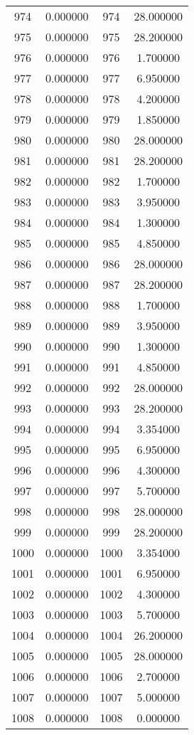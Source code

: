 \documentclass[12pt]{article}
\begin{document}
\begin{longtable}{@{}cccc@{}}
974 & 0.000000 & 974 & 28.000000 \\
975 & 0.000000 & 975 & 28.200000 \\
976 & 0.000000 & 976 & 1.700000 \\
977 & 0.000000 & 977 & 6.950000 \\
978 & 0.000000 & 978 & 4.200000 \\
979 & 0.000000 & 979 & 1.850000 \\
980 & 0.000000 & 980 & 28.000000 \\
981 & 0.000000 & 981 & 28.200000 \\
982 & 0.000000 & 982 & 1.700000 \\
983 & 0.000000 & 983 & 3.950000 \\
984 & 0.000000 & 984 & 1.300000 \\
985 & 0.000000 & 985 & 4.850000 \\
986 & 0.000000 & 986 & 28.000000 \\
987 & 0.000000 & 987 & 28.200000 \\
988 & 0.000000 & 988 & 1.700000 \\
989 & 0.000000 & 989 & 3.950000 \\
990 & 0.000000 & 990 & 1.300000 \\
991 & 0.000000 & 991 & 4.850000 \\
992 & 0.000000 & 992 & 28.000000 \\
993 & 0.000000 & 993 & 28.200000 \\
994 & 0.000000 & 994 & 3.354000 \\
995 & 0.000000 & 995 & 6.950000 \\
996 & 0.000000 & 996 & 4.300000 \\
997 & 0.000000 & 997 & 5.700000 \\
998 & 0.000000 & 998 & 28.000000 \\
999 & 0.000000 & 999 & 28.200000 \\
1000 & 0.000000 & 1000 & 3.354000 \\
1001 & 0.000000 & 1001 & 6.950000 \\
1002 & 0.000000 & 1002 & 4.300000 \\
1003 & 0.000000 & 1003 & 5.700000 \\
1004 & 0.000000 & 1004 & 26.200000 \\
1005 & 0.000000 & 1005 & 28.000000 \\
1006 & 0.000000 & 1006 & 2.700000 \\
1007 & 0.000000 & 1007 & 5.000000 \\
1008 & 0.000000 & 1008 & 0.000000 \\

\end{longtable}
\end{document}

